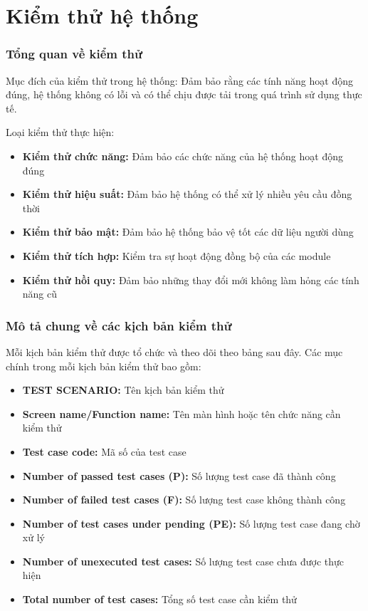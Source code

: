 \chapter{Kiểm thử hệ thống}
\subsection{Tổng quan về kiểm thử}

Mục đích của kiểm thử trong hệ thống: Đảm bảo rằng các tính năng hoạt động đúng, hệ thống không có lỗi và có thể chịu được tải trong quá trình sử dụng thực tế.

Loại kiểm thử thực hiện:
\begin{itemize}
    \item \textbf{Kiểm thử chức năng:} Đảm bảo các chức năng của hệ thống hoạt động đúng
    \item \textbf{Kiểm thử hiệu suất:} Đảm bảo hệ thống có thể xử lý nhiều yêu cầu đồng thời
    \item \textbf{Kiểm thử bảo mật:} Đảm bảo hệ thống bảo vệ tốt các dữ liệu người dùng
    \item \textbf{Kiểm thử tích hợp:} Kiểm tra sự hoạt động đồng bộ của các module
    \item \textbf{Kiểm thử hồi quy:} Đảm bảo những thay đổi mới không làm hỏng các tính năng cũ
\end{itemize}


\subsection{Mô tả chung về các kịch bản kiểm thử}

Mỗi kịch bản kiểm thử được tổ chức và theo dõi theo bảng sau đây. Các mục chính trong mỗi kịch bản kiểm thử bao gồm:
\begin{itemize}
    \item \textbf{TEST SCENARIO:} Tên kịch bản kiểm thử
    \item \textbf{Screen name/Function name:} Tên màn hình hoặc tên chức năng cần kiểm thử
    \item \textbf{Test case code:} Mã số của test case
    \item \textbf{Number of passed test cases (P):} Số lượng test case đã thành công
    \item \textbf{Number of failed test cases (F):} Số lượng test case không thành công
    \item \textbf{Number of test cases under pending (PE):} Số lượng test case đang chờ xử lý
    \item \textbf{Number of unexecuted test cases:} Số lượng test case chưa được thực hiện
    \item \textbf{Total number of test cases:} Tổng số test case cần kiểm thử
\end{itemize}

